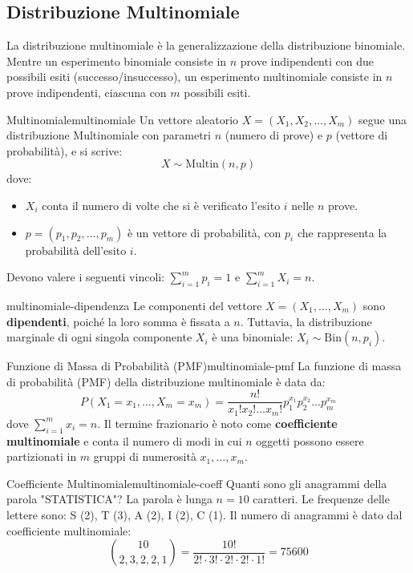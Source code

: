 \subsection{Distribuzione Multinomiale}

La distribuzione multinomiale è la generalizzazione della distribuzione
binomiale. Mentre un esperimento binomiale consiste in $n$ prove indipendenti
con due possibili esiti (successo/insuccesso), un esperimento multinomiale
consiste in $n$ prove indipendenti, ciascuna con $m$ possibili esiti.

\begin{definizione}{Multinomiale}{multinomiale}
Un vettore aleatorio $X = (X_1, X_2, \dots, X_m)$ segue una distribuzione
Multinomiale con parametri $n$ (numero di prove) e $p$ (vettore di
probabilità), e si scrive:
$$
X \sim \text{Multin}(n, p)
$$
dove:
\begin{itemize}
    \item $X_i$ conta il numero di volte che si è verificato l'esito $i$ nelle
    $n$ prove.
    \item $p = (p_1, p_2, \dots, p_m)$ è un vettore di probabilità, con $p_i$
    che rappresenta la probabilità dell'esito $i$.
\end{itemize}
Devono valere i seguenti vincoli: $\sum_{i=1}^{m} p_i = 1$ e $\sum_{i=1}^{m} X_i
= n$.
\end{definizione}

\begin{nota}{}{multinomiale-dipendenza}
Le componenti del vettore $X = (X_1, \dots, X_m)$ sono \textbf{dipendenti},
poiché la loro somma è fissata a $n$. Tuttavia, la distribuzione marginale di
ogni singola componente $X_i$ è una binomiale: $X_i \sim \text{Bin}(n, p_i)$.
\end{nota}

\begin{proposizione}{Funzione di Massa di Probabilità (PMF)}{multinomiale-pmf}
La funzione di massa di probabilità (PMF) della distribuzione multinomiale è
data da:
$$
P(X_1=x_1, \dots, X_m=x_m) = \frac{n!}{x_1! x_2! \dots x_m!} p_1^{x_1} p_2^{x_2}
\dots p_m^{x_m}
$$
dove $\sum_{i=1}^{m} x_i = n$. Il termine frazionario è noto come
\textbf{coefficiente multinomiale} e conta il numero di modi in cui $n$ oggetti
possono essere partizionati in $m$ gruppi di numerosità $x_1, \dots, x_m$.
\end{proposizione}

\begin{esempio}{Coefficiente Multinomiale}{multinomiale-coeff}
Quanti sono gli anagrammi della parola "STATISTICA"?
La parola è lunga $n=10$ caratteri. Le frequenze delle lettere sono: S (2), T
(3), A (2), I (2), C (1).
Il numero di anagrammi è dato dal coefficiente multinomiale:
$$
\binom{10}{2, 3, 2, 2, 1} = \frac{10!}{2! \cdot 3! \cdot 2! \cdot 2! \cdot 1!} =
75600
$$
\end{esempio}



